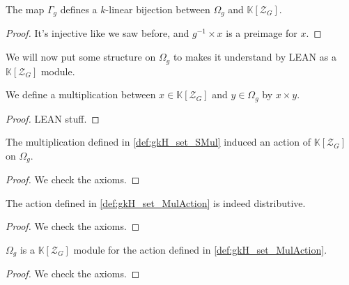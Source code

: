 \begin{definition}
    \label{def:gkH_set_iso_kH_k}
    \leanok
    The map $\Gamma_g$ defines a $k$-linear bijection between $\Omega_g$ and $\mathbb{K}[\mathcal{Z}_G]$.
    \begin{proof}    
        \leanok
        It's injective like we saw before, and $g^{-1}\times x$ is a preimage for $x$.
    \end{proof}
\end{definition}

We will now put some structure on $\Omega_g$ to makes it understand by LEAN as
 a $\mathbb{K}[\mathcal{Z}_G]$ module.

\begin{definition}
    \label{def:gkH_set_SMul}
    \leanok
    We define a multiplication between $x\in\mathbb{K}[\mathcal{Z}_G]$ and $y\in\Omega_g$ by 
    $x\times y$.
    \begin{proof}    
        \leanok
        LEAN stuff.
    \end{proof}
\end{definition}

\begin{definition}
    \label{def:gkH_set_MulAction}
    \leanok
    The multiplication defined in \ref{def:gkH_set_SMul} induced an action of $\mathbb{K}[\mathcal{Z}_G]$
    on $\Omega_g$.
    \begin{proof}    
        \leanok
        We check the axioms.
    \end{proof}
\end{definition}

\begin{proposition}
    \label{prop:gkH_set_DistribMulAction}
    \leanok
    The action defined in \ref{def:gkH_set_MulAction} is indeed distributive.
\end{proposition}
\begin{proof}
    \leanok
    We check the axioms.
\end{proof}

\begin{proposition}
    \label{prop:gkH_set_Module}
    \leanok
    $\Omega_g$ is a $\mathbb{K}[\mathcal{Z}_G]$ module for the action defined in \ref{def:gkH_set_MulAction}.
\end{proposition}
\begin{proof}
    \leanok
    We check the axioms.
\end{proof}

